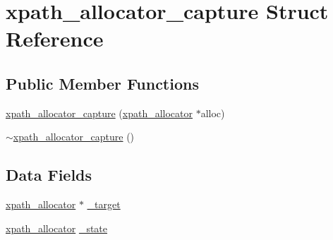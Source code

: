 \hypertarget{structxpath__allocator__capture}{\section{xpath\-\_\-allocator\-\_\-capture Struct Reference}
\label{structxpath__allocator__capture}
}
\subsection*{Public Member Functions}
\begin{DoxyCompactItemize}
\item 
\hyperlink{structxpath__allocator__capture_af6925e08c811c0cbda74d4da5b9f2eed}{xpath\-\_\-allocator\-\_\-capture} (\hyperlink{classxpath__allocator}{xpath\-\_\-allocator} $\ast$alloc)
\item 
\hyperlink{structxpath__allocator__capture_a09d4f62de6a543483b94eec405667101}{$\sim$xpath\-\_\-allocator\-\_\-capture} ()
\end{DoxyCompactItemize}
\subsection*{Data Fields}
\begin{DoxyCompactItemize}
\item 
\hyperlink{classxpath__allocator}{xpath\-\_\-allocator} $\ast$ \hyperlink{structxpath__allocator__capture_a382acca931c691699ec84a03fb060cf4}{\-\_\-target}
\item 
\hyperlink{classxpath__allocator}{xpath\-\_\-allocator} \hyperlink{structxpath__allocator__capture_a275859dc99681c12b42ee4f51b713d39}{\-\_\-state}
\end{DoxyCompactItemize}


